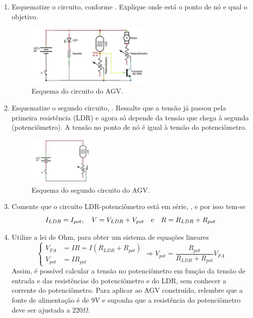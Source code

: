 \documentclass{textolivre-html}
\begin{document}
\begin{enumerate}
\item Esquematize o circuito, conforme . Explique onde está o ponto
de nó e qual o objetivo.

\begin{figure}[h!]
\centering
\includegraphics[width=0.6\textwidth]{figure-33.pdf}
\caption{Esquema do circuito do AGV.}
\label{fig23}
\end{figure}

\item Esquematize o segundo circuito, . Ressalte que a tensão já
passou pela primeira resistência (LDR) e agora só depende da tensão que chega à
segunda (potenciômetro). A tensão no ponto de nó é igual à tensão do
potenciômetro.

\begin{figure}[h!]
\centering
\includegraphics[width=0.3\textwidth]{figure-34.pdf}
\caption{Esquema do segundo circuito do AGV.}
\label{fig24}
\end{figure}

\item Comente que o circuito LDR-potenciômetro está em série, , e por isso tem-se
\begin{equation*}
I_{LDR} = I_{pot}, \quad V = V_{LDR} + V_{pot} \quad \textmd{e} \quad R=R_{LDR} + R_{pot}
\end{equation*}

\item Utilize a lei de Ohm, para obter um sistema de equações lineares
\begin{equation*}
\begin{cases}
V_{FA} &= IR = I(R_{LDR}+R_{pot}) \\
V_{pot} &= I R_{pot}
\end{cases} 
\Rightarrow V_{pot} = \frac{R_{pot}}{R_{LDR} + R_{pot}} V_{FA}
\end{equation*}
Assim, é possível calcular a tensão no potenciômetro em função da tensão de
entrada e das resistências do potenciômetro e do LDR, sem conhecer a corrente
do potenciômetro. Para aplicar ao AGV construído, relembre que a fonte de
alimentação é de 9V e suponha que a resistência do potenciômetro deve ser
ajustada a $220\Omega$.


\end{enumerate}
\end{document}

